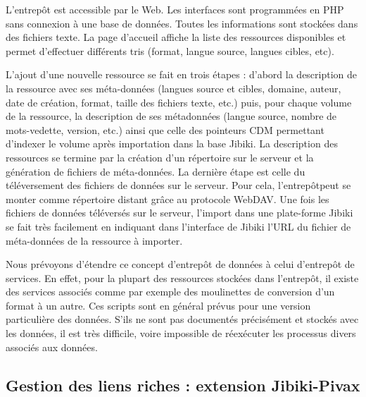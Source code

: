 \documentclass[10pt,a4paper,twoside]{article}
\begin{document}
L'entrepôt est accessible par le Web. Les interfaces sont programmées en PHP sans connexion à une base de données. Toutes les informations sont stockées dans des fichiers texte. 
La page d'accueil affiche la liste des ressources disponibles et permet d'effectuer différents tris (format, langue source, langues cibles, etc).

L'ajout d'une nouvelle ressource se fait en trois étapes : d'abord la description de la ressource avec ses méta-données (langues source et cibles, domaine, auteur, date de création, format, taille des fichiers texte, etc.) puis, pour chaque volume de la ressource, la description de ses métadonnées (langue source, nombre de mots-vedette, version, etc.) ainsi que celle des pointeurs CDM permettant d'indexer le volume après importation dans la base Jibiki.
La description des ressources se termine par la création d'un répertoire sur le serveur et la génération de fichiers de méta-données.
La dernière étape est celle du téléversement des fichiers de données sur le serveur. Pour cela, l'entrepôtpeut se monter comme répertoire distant grâce au protocole WebDAV.
Une fois les fichiers de données téléversés sur le serveur, l'import dans une plate-forme Jibiki se fait très facilement en indiquant dans l'interface de Jibiki l'URL du fichier de méta-données de la ressource à importer.

Nous prévoyons d'étendre ce concept d'entrepôt de données à celui d'entrepôt de services. En effet, pour la plupart des ressources stockées dans l'entrepôt, il existe des services associés comme par exemple des moulinettes de conversion d'un format à un autre. Ces scripts sont en général prévus pour une version particulière des données. S'ils ne sont pas documentés précisément et stockés avec les données, il est très difficile, voire impossible de réexécuter les processus divers associés aux données.


\subsection{Gestion des liens riches : extension Jibiki-Pivax}
\end{document}
